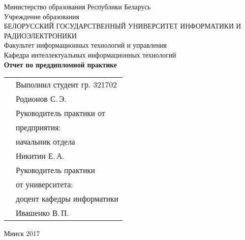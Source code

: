 \begin{titlepage}
    
    \begin{center}
        Министерство образования Республики Беларусь \\[0.4cm] 

        Учреждение образования \\

        \MakeUppercase{БЕЛОРУССКИЙ ГОСУДАРСТВЕННЫЙ УНИВЕРСИТЕТ ИНФОРМАТИКИ И РАДИОЭЛЕКТРОНИКИ} \\[0.4cm]

        Факультет информационных технологий и управления \\[0.4cm]

        Кафедра интеллектуальных информационных технологий \\[3.4cm] %

        {\large\bfseries{Отчет по преддипломной практике}} \\[2cm]

        \noindent
        \begin{tabular}{p{}p{}}
            & Выполнил студент гр. 321702 \\
            & Родионов С.\,Э. \\[1cm]

            & Руководитель практики от \\
            & предприятия: \\
            & начальник отдела \\
            & Никитин Е.\,А. \\[1cm]

            & Руководитель практики \\
            & от университета: \\
            & доцент кафедры информатики \\
            & Ивашенко В.\,П. \\
        \end{tabular}

        \vfill

        {\normalsize Минск 2017}
    \end{center}

\end{titlepage}
